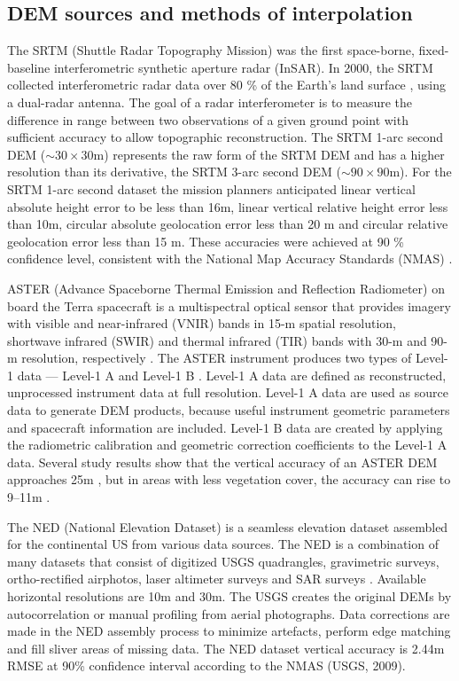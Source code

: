 \documentclass[12pt,letterpaper]{article}
\begin{document}
\subsection{DEM sources and methods of interpolation}
The SRTM (Shuttle Radar Topography Mission) was the first space-borne,
fixed-baseline interferometric synthetic aperture radar (InSAR). In
2000, the SRTM collected interferometric radar data over 80 \% of the
Earth's land surface \citep{Zhang2008}, using a dual-radar
antenna. The goal of a radar interferometer is to measure the
difference in range between two observations of a given ground point
with sufficient accuracy to allow topographic reconstruction. The SRTM
1-arc second DEM ($\sim 30 \times 30$m) represents the raw form of the
SRTM DEM and has a higher resolution than its derivative, the SRTM
3-arc second DEM ($\sim 90 \times 90$m).  For the SRTM 1-arc second
dataset the mission planners anticipated linear vertical absolute
height error to be less than 16m, linear vertical relative height
error less than 10m, circular absolute geolocation error less than 20
m and circular relative geolocation error less than 15 m. These
accuracies were achieved at 90 \% confidence level, consistent with
the National Map Accuracy Standards (NMAS) \citep{Farr2007}.
 
ASTER (Advance Spaceborne Thermal Emission and Reflection Radiometer)
on board the Terra spacecraft is a multispectral optical sensor that
provides imagery with visible and near-infrared (VNIR) bands in 15-m
spatial resolution, shortwave infrared (SWIR) and thermal infrared
(TIR) bands with 30-m and 90-m resolution, respectively
\citep{Abrams2000}. The ASTER instrument produces two types of Level-1
data --- Level-1 A and Level-1 B \citep{Fujisada2005}. Level-1 A data
are defined as reconstructed, unprocessed instrument data at full
resolution. Level-1 A data are used as source data to generate DEM
products, because useful instrument geometric parameters and
spacecraft information are included. Level-1 B data are created by
applying the radiometric calibration and geometric correction
coefficients to the Level-1 A data.  Several study results show that
the vertical accuracy of an ASTER DEM approaches 25m
\citep{Fujisada2005}, but in areas with less vegetation cover, the
accuracy can rise to 9--11m \citep{Goncalves2004}.

The NED (National Elevation Dataset) is a seamless elevation dataset
assembled for the continental US from various data sources. The NED is
a combination of many datasets that consist of digitized USGS
quadrangles, gravimetric surveys, ortho-rectified airphotos, laser
altimeter surveys and SAR surveys \citep{Shaffer2006}.  Available
horizontal resolutions are 10m and 30m.  The USGS creates the original
DEMs by autocorrelation or manual profiling from aerial
photographs. Data corrections are made in the NED assembly process to
minimize artefacts, perform edge matching and fill sliver areas of
missing data.  The NED dataset vertical accuracy is 2.44m RMSE at 90\%
confidence interval according to the NMAS (USGS, 2009).
\end{document}
